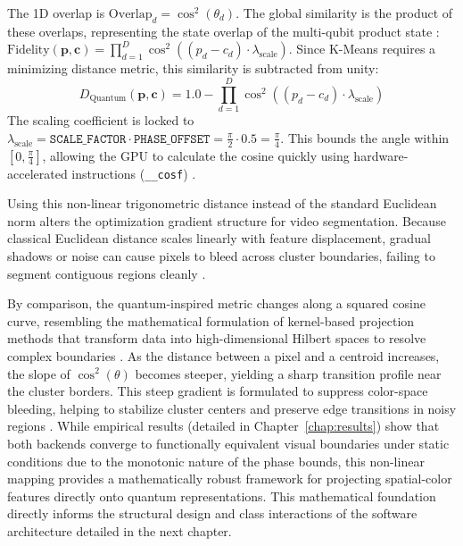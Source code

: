 The 1D overlap is $\text{Overlap}_d = \cos^2(\theta_d)$. The global similarity is the product of these overlaps, representing the state overlap of the multi-qubit product state \cite{buhrman2001quantum}: $\text{Fidelity}(\mathbf{p}, \mathbf{c}) = \prod_{d=1}^{D} \cos^2\left( (p_d - c_d) \cdot \lambda_{\text{scale}} \right)$. Since K-Means requires a minimizing distance metric, this similarity is subtracted from unity:
\begin{equation}
D_{\text{Quantum}}(\mathbf{p},\mathbf{c}) = 1.0 - \prod_{d=1}^{D} \cos^2\left( (p_d - c_d) \cdot \lambda_{\text{scale}} \right)
\end{equation}
The scaling coefficient is locked to $\lambda_{\text{scale}} = \texttt{SCALE\_FACTOR} \cdot \texttt{PHASE\_OFFSET} = \frac{\pi}{2} \cdot 0.5 = \frac{\pi}{4}$. This bounds the angle within $[0, \frac{\pi}{4}]$, allowing the GPU to calculate the cosine quickly using hardware-accelerated instructions (\texttt{\_\_cosf}) \cite{CudaGuide}.

Using this non-linear trigonometric distance instead of the standard Euclidean norm alters the optimization gradient structure for video segmentation. Because classical Euclidean distance scales linearly with feature displacement, gradual shadows or noise can cause pixels to bleed across cluster boundaries, failing to segment contiguous regions cleanly \cite{gonzalez2009digital, szeliski2022computer}.

By comparison, the quantum-inspired metric changes along a squared cosine curve, resembling the mathematical formulation of kernel-based projection methods that transform data into high-dimensional Hilbert spaces to resolve complex boundaries \cite{scholkopf1998nonlinear}. As the distance between a pixel and a centroid increases, the slope of $\cos^2(\theta)$ becomes steeper, yielding a sharp transition profile near the cluster borders. This steep gradient is formulated to suppress color-space bleeding, helping to stabilize cluster centers and preserve edge transitions in noisy regions \cite{shi2000normalized, achanta2012slic}. While empirical results (detailed in Chapter~\ref{chap:results}) show that both backends converge to functionally equivalent visual boundaries under static conditions due to the monotonic nature of the phase bounds, this non-linear mapping provides a mathematically robust framework for projecting spatial-color features directly onto quantum representations. This mathematical foundation directly informs the structural design and class interactions of the software architecture detailed in the next chapter.
